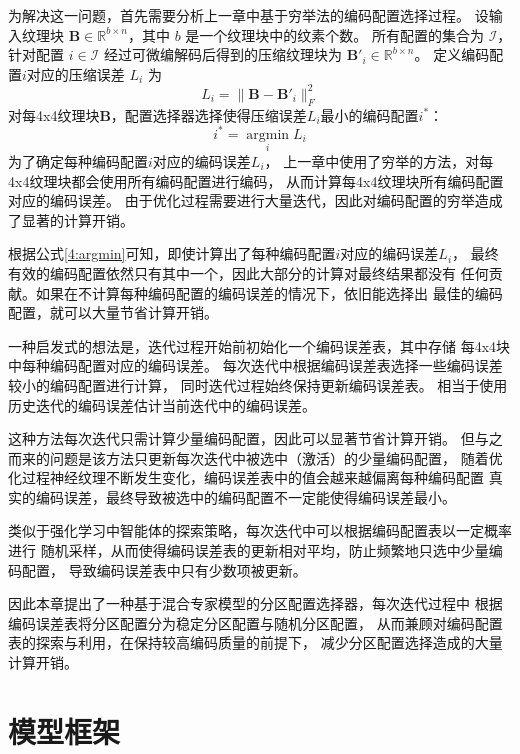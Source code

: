 为解决这一问题，首先需要分析上一章中基于穷举法的编码配置选择过程。
设输入纹理块 $\mathbf{B}\in\mathbb{R}^{b\times n}$，其中 $b$ 是一个纹理块中的纹素个数。
所有配置的集合为 $\mathcal{I}$，针对配置 $i\in\mathcal{I}$ 经过可微编解码后得到的压缩纹理块为 $\mathbf{B}'_i\in\mathbb{R}^{b\times n}$。
定义编码配置$i$对应的压缩误差 $L_i$ 为
\begin{equation}
L_i=\|\mathbf{B}-\mathbf{B}'_i\|_F^2
\end{equation}
对每4x4纹理块$\mathbf{B}$，配置选择器选择使得压缩误差$L_i$最小的编码配置$i^*$：
\begin{equation}
    \label{4:argmin}
    i^*=\mathop{\arg\min}\limits_{i} L_i
\end{equation}
为了确定每种编码配置$i$对应的编码误差$L_i$，
上一章中使用了穷举的方法，对每4x4纹理块都会使用所有编码配置进行编码，
从而计算每4x4纹理块所有编码配置对应的编码误差。
由于优化过程需要进行大量迭代，因此对编码配置的穷举造成了显著的计算开销。

根据公式\ref{4:argmin}可知，即使计算出了每种编码配置$i$对应的编码误差$L_i$，
最终有效的编码配置依然只有其中一个，因此大部分的计算对最终结果都没有
任何贡献。如果在不计算每种编码配置的编码误差的情况下，依旧能选择出
最佳的编码配置，就可以大量节省计算开销。

一种启发式的想法是，迭代过程开始前初始化一个编码误差表，其中存储
每4x4块中每种编码配置对应的编码误差。
每次迭代中根据编码误差表选择一些编码误差较小的编码配置进行计算，
同时迭代过程始终保持更新编码误差表。
相当于使用历史迭代的编码误差估计当前迭代中的编码误差。

这种方法每次迭代只需计算少量编码配置，因此可以显著节省计算开销。
但与之而来的问题是该方法只更新每次迭代中被选中（激活）的少量编码配置，
随着优化过程神经纹理不断发生变化，编码误差表中的值会越来越偏离每种编码配置
真实的编码误差，最终导致被选中的编码配置不一定能使得编码误差最小。

类似于强化学习中智能体的探索策略，每次迭代中可以根据编码配置表以一定概率进行
随机采样，从而使得编码误差表的更新相对平均，防止频繁地只选中少量编码配置，
导致编码误差表中只有少数项被更新。

因此本章提出了一种基于混合专家模型的分区配置选择器，每次迭代过程中
根据编码误差表将分区配置分为稳定分区配置与随机分区配置，
从而兼顾对编码配置表的探索与利用，在保持较高编码质量的前提下，
减少分区配置选择造成的大量计算开销。

\section{模型框架}

